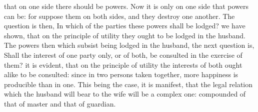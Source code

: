 \documentclass[12pt]{report}
\begin{document}
that on one side there should be powers. Now it is only on one side that
powers can be: for suppose them on both sides, and they destroy one
another. The question is then, In which of the parties these powers
shall be lodged? we have shown, that on the principle of utility they
ought to be lodged in the husband. The powers then which subsist being
lodged in the husband, the next question is, Shall the interest of one
party only, or of both, be consulted in the exercise of them? it is
evident, that on the principle of utility the interests of both ought
alike to be consulted: since in two persons taken together, more
happiness is producible than in one. This being the case, it is
manifest, that the legal relation which the husband will bear to the
wife will be a complex one: compounded of that of master and that of
guardian.
\end{document}
